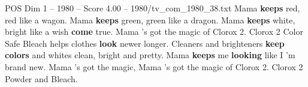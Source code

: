 \begin{textsample}{POS Dim 1 – 1980 – Score 4.00 – 1980/tv\_com\_1980\_38.txt}  \label{ex:f1_pos_048}
Mama \textbf{keeps} red, red like a wagon.
Mama \textbf{keeps} green, green like a dragon.
Mama \textbf{keeps} white, bright like a wish \textbf{come} true.
Mama 's got the magic of Clorox 2.
Clorox 2 Color Safe Bleach helps clothes \textbf{look} newer longer.
Cleaners and brighteners \textbf{keep} \textbf{colors} and whites clean, bright and pretty.
Mama \textbf{keeps} me \textbf{looking} like I 'm brand new.
Mama 's got the magic, Mama 's got the magic of Clorox 2.
Clorox 2 Powder and Bleach.

\end{textsample}
